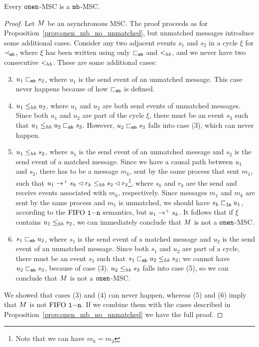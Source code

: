 \begin{proposition} \label{prop:onen_mb_unmatched}
	Every $\mathtt{onen}$-MSC is a $\mathtt{mb}$-MSC.
\end{proposition}
\begin{proof}
Let $M$ be an asynchronous MSC. The proof proceeds as for Proposition~\ref{prop:onen_mb_no_unmatched}, but unmatched messages introduce some additional cases. Consider any two adjacent events $s_1$ and $s_2$ in a cycle $\xi$ for $\prec_{\mathtt{mb}}$, where $\xi$ has been written using only $\sqsubset_{\mathtt{mb}}$ and $<_{hb}$, and we never have two consecutive $<_{hb}$. These are some additional cases:
\begin{enumerate}\setcounter{enumi}{2}
	\item $u_1 \sqsubset_{\mathtt{mb}} s_2$, where $u_1$ is the send event of an unmatched message. This case never happens because of how $\sqsubset_{\mathtt{mb}}$ is defined.
	\item $u_1 \leq_{hb} u_2$, where $u_1$ and $u_2$ are both send events of unmatched messages. Since both $u_1$ and $u_2$ are part of the cycle $\xi$, there must be an event $s_3$ such that $u_1 \leq_{hb} u_2 \sqsubset_{\mathtt{mb}} s_3$. However, $u_2 \sqsubset_{\mathtt{mb}} s_3$ falls into case (3), which can never happen.
	\item $u_1 \leq_{hb} s_2$, where $u_1$ is the send event of an unmatched message and $s_2$ is the send event of a matched message. Since we have a causal path between $u_1$ and $s_2$, there has to be a message $m_k$, sent by the same process that sent $m_1$, such that $u_1 \to^+ s_k \lhd r_k \leq_{hb} s_2 \lhd r_2$\footnote{Note that we can have $m_k = m_2$}, where $s_k$ and $r_k$ are the send and receive events associated with $m_k$, respectively. Since messages $m_1$ and $m_k$ are sent by the same process and $m_1$ is unmatched, we should have $s_k \sqsubset_{\mathtt{1n}} u_1$, according to the $\text{FIFO } \mathtt{1\mathsf{-}n}$ semantics, but $u_1 \to^+ s_k$. It follows that if $\xi$ contains $u_1 \leq_{hb} s_2$, we can immediately conclude that $M$ is not a $\mathtt{onen}$-MSC.
	\item $s_1 \sqsubset_{\mathtt{mb}} u_2$,  where $s_1$ is the send event of a matched message and $u_2$ is the send event of an unmatched message. Since both $s_1$ and $u_2$ are part of a cycle, there must be an event $s_3$ such that $s_1 \sqsubset_{\mathtt{mb}} u_2 \leq_{hb} s_3$; we cannot have $u_2 \sqsubset_{\mathtt{mb}} s_3$, because of case (3). $u_2 \leq_{hb} s_3$ falls into case (5), so we can conclude that $M$ is not a $\mathtt{onen}$-MSC.
\end{enumerate}
We showed that cases (3) and (4) can never happen, whereas  (5) and (6)  imply that $M$ is not $\text{FIFO } \mathtt{1\mathsf{-}n}$. If we combine them with the cases described in Proposition~\ref{prop:onen_mb_no_unmatched} we have the full proof.
\end{proof}

